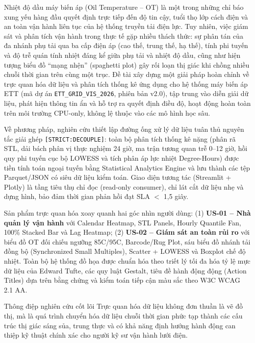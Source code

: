 \documentclass[12pt,a4paper,oneside]{report}
\newcommand{\dC}{\textdegree C\xspace}
\newcommand{\code}[1]{\texttt{#1}}
\begin{document}
Nhiệt độ dầu máy biến áp (Oil Temperature -- OT) là một trong những chỉ báo xung yếu hàng đầu quyết định trực tiếp đến độ tin cậy, tuổi thọ lớp cách điện và an toàn vận hành liên tục của hệ thống truyền tải điện lực. Tuy nhiên, việc giám sát và phân tích vận hành trong thực tế gặp nhiều thách thức: sự phân tán của đa nhánh phụ tải qua ba cấp điện áp (cao thế, trung thế, hạ thế), tính phi tuyến và độ trễ quán tính nhiệt đáng kể giữa phụ tải và nhiệt độ dầu, cũng như hiện tượng biểu đồ ``mạng nhện'' (spaghetti plot) gây rối loạn thị giác khi chồng nhiều chuỗi thời gian trên cùng một trục. Đề tài xây dựng một giải pháp hoàn chỉnh về trực quan hóa dữ liệu và phân tích thống kê ứng dụng cho hệ thống máy biến áp ETT (mã dự án \code{ETT\_GRID\_VIS\_2026}, phiên bản v2.0), tập trung vào diễn giải dữ liệu, phát hiện thông tin ẩn và hỗ trợ ra quyết định điều độ, hoạt động hoàn toàn trên môi trường CPU-only, không lệ thuộc vào các mô hình học sâu.

Về phương pháp, nghiên cứu thiết lập đường ống xử lý dữ liệu tuân thủ nguyên tắc giải ghép \code{[STRICT:DECOUPLE]}: toàn bộ phân tích thống kê nặng (phân rã STL, dải bách phân vị thực nghiệm 24 giờ, ma trận tương quan trễ 0--12 giờ, hồi quy phi tuyến cục bộ LOWESS và tích phân áp lực nhiệt Degree-Hours) được tiền tính toán ngoại tuyến bằng Statistical Analytics Engine và lưu thành các tệp Parquet/JSON có siêu dữ liệu kiểm toán. Giao diện tương tác (Streamlit + Plotly) là tầng tiêu thụ chỉ đọc (read-only consumer), chỉ lát cắt dữ liệu nhẹ và dựng hình, bảo đảm thời gian phản hồi đạt SLA $<$ 1,5 giây.

Sản phẩm trực quan hóa xoay quanh hai góc nhìn người dùng: (1) \textbf{US-01 -- Nhà quản lý vận hành} với Calendar Heatmap, STL Panels, Hourly Quantile Fan, 100\% Stacked Bar và Lag Heatmap; (2) \textbf{US-02 -- Giám sát an toàn rủi ro} với biểu đồ OT đối chiếu ngưỡng 85\dC/95\dC, Barcode/Rug Plot, sáu biểu đồ nhánh tải đồng bộ (Synchronized Small Multiples), Scatter + LOWESS và Boxplot chế độ nhiệt. Toàn bộ hệ thống đồ họa được chuẩn hóa theo triết lý tối đa hóa tỷ lệ mực dữ liệu của Edward Tufte, các quy luật Gestalt, tiêu đề hành động động (Action Titles) dựa trên bằng chứng và kiểm toán tiếp cận màu sắc theo W3C WCAG 2.1 AA.

\begin{calloutbox}{Thông điệp nghiên cứu cốt lõi}
Trực quan hóa dữ liệu không đơn thuần là vẽ đồ thị, mà là quá trình chuyển hóa dữ liệu chuỗi thời gian phức tạp thành các cấu trúc thị giác sáng sủa, trung thực và có khả năng định hướng hành động can thiệp kỹ thuật chính xác cho người kỹ sư vận hành lưới điện.
\end{calloutbox}
\end{document}
